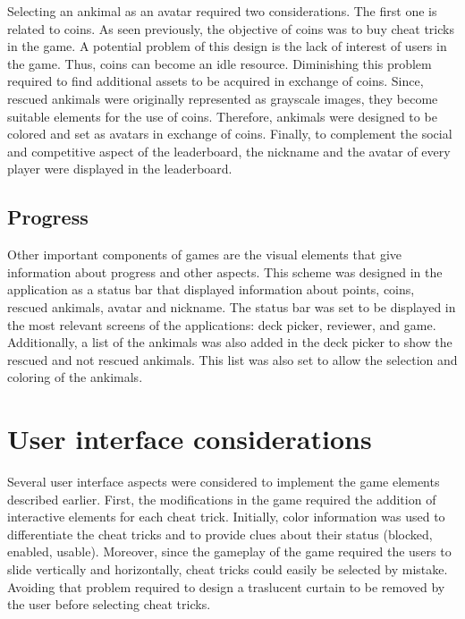 Selecting an ankimal as an avatar required two considerations. The first one is related to coins. As seen previously, the objective of coins was to buy cheat tricks in the game. A potential problem of this design is the lack of interest of users in the game. Thus, coins can become an idle resource. Diminishing this problem required to find additional assets to be acquired in exchange of coins. Since, rescued ankimals were originally represented as grayscale images, they become suitable elements for the use of coins. Therefore, ankimals were designed to be colored and set as avatars in exchange of coins. Finally, to complement the social and competitive aspect of the leaderboard, the nickname and the avatar of every player were displayed in the leaderboard.

\subsection{Progress}
Other important components of games are the visual elements that give information about progress and other aspects. This scheme was designed in the application as a status bar that displayed information about points, coins, rescued ankimals, avatar and nickname. The status bar was set to be displayed in the most relevant screens of the applications: deck picker, reviewer, and game. Additionally, a list of the ankimals was also added in the deck picker to show the rescued and not rescued ankimals. This list was also set to allow the selection and coloring of the ankimals.

\section{User interface considerations}
Several user interface aspects were considered to implement the game elements described earlier. First, the modifications in the game required the addition of interactive elements for each cheat trick. Initially, color information was used to differentiate the cheat tricks and to provide clues about their status (blocked, enabled, usable). Moreover, since the gameplay of the game required the users to slide vertically and horizontally, cheat tricks could easily be selected by mistake. Avoiding that problem required to design a traslucent curtain to be removed by the user before selecting cheat tricks.

